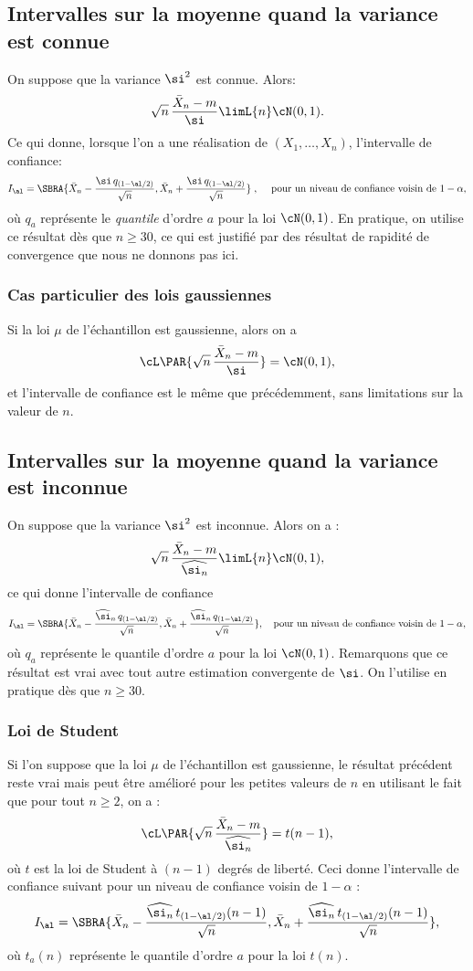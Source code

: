 %
\subsection{Intervalles sur la moyenne quand la variance est connue} 
%

On suppose que la variance $\si^2$ est connue. Alors:
$$
\sqrt{n}\,\frac{\bar{X}_n -m}{\si} \limL{n} \cN(0,1).
$$
Ce qui donne, lorsque l'on a une réalisation de $(X_1,\ldots,X_n)$,
l'intervalle de confiance:
$$
I_\al=\SBRA{\bar{X}_n-\frac{\si \, q_{(1-\al/2)}}{\sqrt{n}},
  \bar{X}_n+\frac{\si \, q_{(1-\al/2)}}{\sqrt{n}}} \;,\;
\text{\quad pour un niveau de confiance voisin de $1-\alpha$},  
$$
où $q_a$ représente le \emph{quantile} d'ordre $a$ pour la loi $\cN(0,1)$.
En pratique, on utilise ce résultat dès que $n \geq 30$, ce qui est justifié
par des résultat de rapidité de convergence que nous ne donnons pas ici.

\subsubsection{Cas particulier des lois gaussiennes}

Si la loi $\mu$ de l'échantillon est gaussienne, alors on a
$$
\cL\PAR{\sqrt{n}\,\frac{\bar{X}_n-m}{\si}} = \cN(0,1),
$$
et l'intervalle de confiance est le même que précédemment, sans limitations
sur la valeur de $n$.


\subsection{Intervalles sur la moyenne quand la variance est inconnue} 

On suppose que la variance $\si^2$ est inconnue. Alors on a :
$$
\sqrt{n}\,\frac{\bar{X}_n-m}{\widehat{\si_n}} \limL{n} \cN(0,1),
$$
ce qui donne l'intervalle de confiance
$$
I_\al=\SBRA{\bar{X}_n-\frac{\widehat{\si}_n\,q_{(1-\al/2)}}{\sqrt{n}},
  \bar{X}_n+\frac{\widehat{\si}_n\,q_{(1-\al/2)}}{\sqrt{n}}},
\text{\quad pour un niveau de confiance voisin de $1-\alpha$},
$$
où $q_a$ représente le quantile d'ordre $a$ pour la loi $\cN(0,1)$.
Remarquons que ce résultat est vrai avec tout autre estimation convergente
de $\si$. On l'utilise en pratique dès que $n \geq 30$.

\subsubsection{Loi de Student} 

Si l'on suppose que la loi $\mu$ de l'échantillon est gaussienne, le résultat
précédent reste vrai mais peut être amélioré pour les petites valeurs de $n$
en utilisant le fait que pour tout $n\geq 2$, on a :
$$
\cL\PAR{\sqrt{n}\,\frac{\bar{X}_n-m}{\widehat{\si_n}}} = t(n-1),
$$
où $t$ est la loi de Student à $(n-1)$ degrés de liberté. Ceci donne
l'intervalle de confiance suivant pour un niveau de confiance voisin de
$1-\alpha$ :
$$
I_\al=\SBRA{\bar{X}_n-\frac{\widehat{\si_n}\,t_{(1-\al/2)}(n-1)}{\sqrt{n}},
  \bar{X}_n+\frac{\widehat{\si_n}\,t_{(1-\al/2)}(n-1)}{\sqrt{n}}},
$$
où $t_a(n)$ représente le quantile d'ordre $a$ pour la loi $t(n)$.

